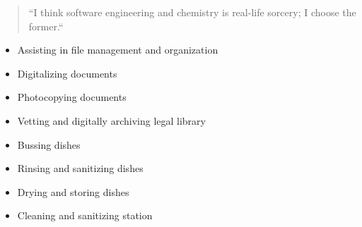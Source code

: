 \documentclass[10pt,letterpaper,ragged2e,withhyper]{altacv}
\author{Jordan Hogan-Sharpe}
\date{\today}
\title{}
\begin{document}


\makecvheader

\begin{quote}
``I think software engineering and chemistry is real-life sorcery; I choose the former.``
\end{quote}

\begin{paracol}{2}

\label{sec:org223c9c6}

\begin{itemize}
\item Assisting in file management and organization
\item Digitalizing documents
\item Photocopying documents
\item Vetting and digitally archiving legal library
\end{itemize}

\label{sec:org7318c76}

\begin{itemize}
\item Bussing dishes
\item Rinsing and sanitizing dishes
\item Drying and storing dishes
\item Cleaning and sanitizing station
\end{itemize}

\switchcolumn

\label{sec:org93ce42f}

\divider


\divider


\divider

\newline
{}
\cvtag{\LaTeX}


\end{paracol}
\end{document}

